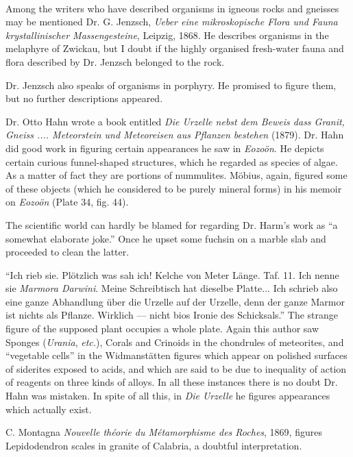 \documentclass[a4paper, 12pt, oneside]{article}
\begin{document}
\paragraph{}
Among the writers who have described organisms in igneous rocks and gneisses may be mentioned Dr. G. Jenzsch, \emph{Ueber eine mikroskopische Flora und Fauna krystallinischer Massengesteine}, Leipzig, 1868. He describes organisms in the melaphyre of Zwickau, but I doubt if the highly organised fresh-water fauna and flora described by Dr. Jenzsch belonged to the rock.

Dr. Jenzsch also speaks of organisms in porphyry. He promised to figure them, but no further descriptions appeared.

Dr. Otto Hahn wrote a book entitled \emph{Die Urzelle nebst dem Beweis dass Granit, Gneiss .... Meteorstein und Meteoreisen aus Pflanzen bestehen} (1879). Dr. Hahn did good work in figuring certain appearances he saw in \emph{Eozoön}. He depicts certain curious funnel-shaped structures, which he regarded as species of algae. As a matter of fact they are portions of nummulites. Möbius, again, figured some of these objects (which he considered to be purely mineral forms) in his memoir on \emph{Eozoön} (Plate 34, fig. 44).

The scientific world can hardly be blamed for regarding Dr. Harm's work as ``a somewhat elaborate joke.'' Once he upset some fuchsin on a marble slab and proceeded to clean the latter.

``Ich rieb sie. Plötzlich was sah ich! Kelche von Meter Länge. Taf. 11. Ich nenne sie \emph{Marmora Darwini}. Meine Schreibtisch hat dieselbe Platte... Ich schrieb also eine ganze Abhandlung über die Urzelle auf der Urzelle, denn der ganze Marmor ist nichts als Pflanze. Wirklich --- nicht bios Ironie des Schicksals.'' The strange figure of the supposed plant occupies a whole plate. Again this author saw Sponges (\emph{Urania}, \emph{etc.}), Corals and Crinoids in the chondrules of meteorites, and ``vegetable cells'' in the Widmanstätten figures which appear on polished surfaces of siderites exposed to acids, and which are said to be due to inequality of action of reagents on three kinds of alloys. In all these instances there is no doubt Dr. Hahn was mistaken. In spite of all this, in \emph{Die Urzelle} he figures appearances which actually exist.

C. Montagna \emph{Nouvelle théorie du Métamorphisme des Roches}, 1869, figures Lepidodendron scales in granite of Calabria, a doubtful interpretation.
\end{document}
